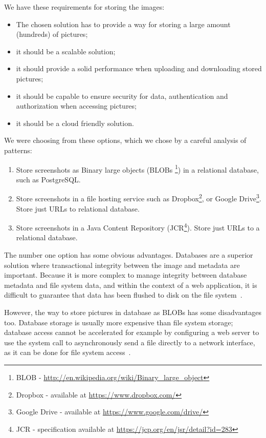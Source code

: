 \documentclass[11pt,oneside,final]{fithesis2}
\begin{document}
    We have these requirements for storing the images:
    
    \begin{itemize}
     \item The chosen solution has to provide a way for storing a large amount (hundreds) of pictures;
     \item it should be a scalable solution;
     \item it should provide a solid performance when uploading and downloading stored pictures;
     \item it should be capable to ensure security for data, authentication and authorization when accessing pictures;
     \item it should be a cloud friendly solution.
    \end{itemize}
 
    We were choosing from these options, which we chose by a careful analysis of patterns:
    \begin{enumerate}
     \item Store screenshots as Binary large objects (BLOBs 
	   \footnote{BLOB - \url{http://en.wikipedia.org/wiki/Binary_large_object}}) in a relational
	   database, such as PostgreSQL.
     \item Store screenshots in a file hosting service such as Dropbox\footnote{Dropbox - available at \url{https://www.dropbox.com/}}, 
     or Google Drive\footnote{Google Drive - available at \url{https://www.google.com/drive/}}. Store just URLs to relational database.
     \item Store screenshots in a Java Content Repository (JCR\footnote{JCR - specification available at 
	   \url{https://jcp.org/en/jsr/detail?id=283}}). Store just URLs to a relational database.
    \end{enumerate}

    The number one option has some obvious advantages. Databases are a superior solution where transactional integrity between the
    image and metadata are important. Because it is more complex to manage integrity between database metadata and file system data, 
    and within the context of a web application, it is difficult to guarantee that data has been flushed to disk on the file system~\citep{storing_images_in_db}.
    
    However, the way to store pictures in database as BLOBs has some disadvantages too. Database storage is usually more expensive
    than file system storage; database access cannot be accelerated for example by configuring a web server to use the system call to
    asynchronously send a file directly to a network interface, as it can be done for file system access~\citep{storing_images_in_db}.
    
\end{document}
